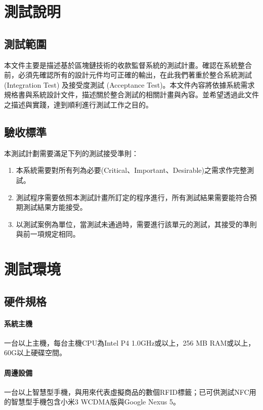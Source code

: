  	\section{測試說明}

 		\subsection{測試範圍}本文件主要是描述基於區塊鏈技術的收款監督系統的測試計畫。確認在系統整合前，必須先確認所有的設計元件均可正確的輸出，在此我們著重於整合系統測試 (Integration Test) 及接受度測試 (Acceptance Test)。本文件內容將依據系統需求規格書與系統設計文件，描述關於整合測試的相關計畫與內容。並希望透過此文件之描述與實踐，達到順利進行測試工作之目的。

 		\subsection{驗收標準}本測試計劃需要滿足下列的測試接受準則： 

 			\begin{enumerate}
				\item 本系統需要對所有列為必要(Critical、Important、Desirable)之需求作完整測試。
				\item 測試程序需要依照本測試計畫所訂定的程序進行，所有測試結果需要能符合預期測試結果方能接受。
				\item 以測試案例為單位，當測試未通過時，需要進行該單元的測試，其接受的準則與前一項規定相同。 
			\end{enumerate}
 	
 	\section{測試環境}

 		\subsection{硬件規格}
 			
 			\paragraph{系統主機}一台以上主機，每台主機CPU為Intel P4 1.0GHz或以上，256 MB RAM或以上，60G以上硬碟空間。
 			\paragraph{周邊設備}一台以上智慧型手機，與用來代表虛擬商品的數個RFID標籤；已可供測試NFC用的智慧型手機包含小米3 WCDMA版與Google Nexus 5。

